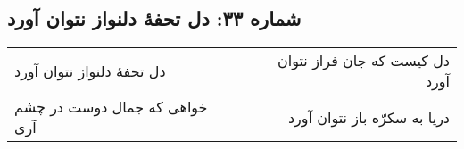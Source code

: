 \begin{center}
\section*{شماره ۳۳: دل تحفۀ دلنواز نتوان آورد}
\label{sec:033}
\begin{longtable}{l p{0.5cm} r}
دل تحفهٔ دلنواز نتوان آورد
&&
دل کیست که جان فراز نتوان آورد
\\
خواهی که جمال دوست در چشم آری
&&
دریا به سکرّه باز نتوان آورد
\\
\end{longtable}
\end{center}
